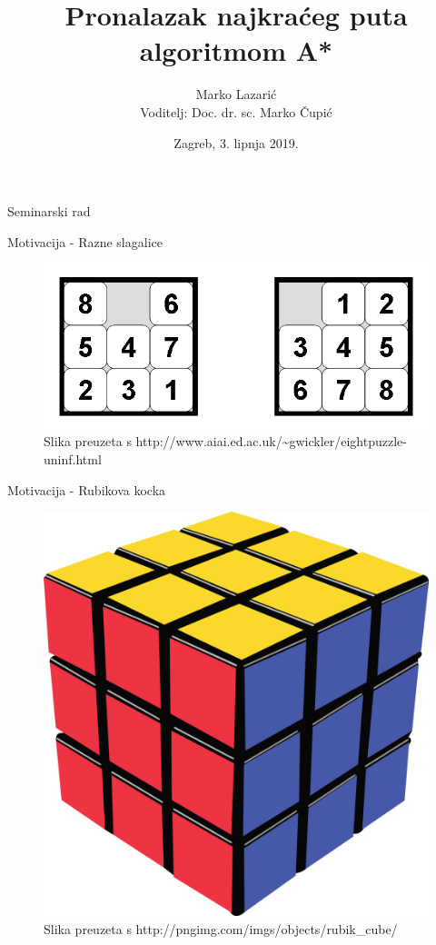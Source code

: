 \documentclass{beamer}
\title{Pronalazak najkraćeg puta algoritmom A*}
\date{\vspace{1em}Zagreb, 3. lipnja 2019.}
\institute{Fakultet elektrotehnike i računarstva}
\author{Marko Lazarić\\
Voditelj: Doc. dr. sc. Marko Čupić}
\begin{document}
  \begin{frame}
  	\centering
  	\vspace{3em}
  	Seminarski rad
  	\vspace{-5em}
  	
  	\titlepage
  \end{frame}

	\begin{frame}{Motivacija - Razne slagalice}
		\begin{figure}
			\includegraphics[scale=0.5]{images/8puzzle.png}
			\caption{Slika preuzeta s http://www.aiai.ed.ac.uk/\~{}gwickler/eightpuzzle-uninf.html}
		\end{figure}
	\end{frame}

	\begin{frame}{Motivacija - Rubikova kocka}
		\begin{figure}
			\includegraphics[scale=0.4]{images/rubik_cube.png}
			\caption{Slika preuzeta s http://pngimg.com/imgs/objects/rubik\_cube/}
		\end{figure}
	\end{frame}
\end{document}
